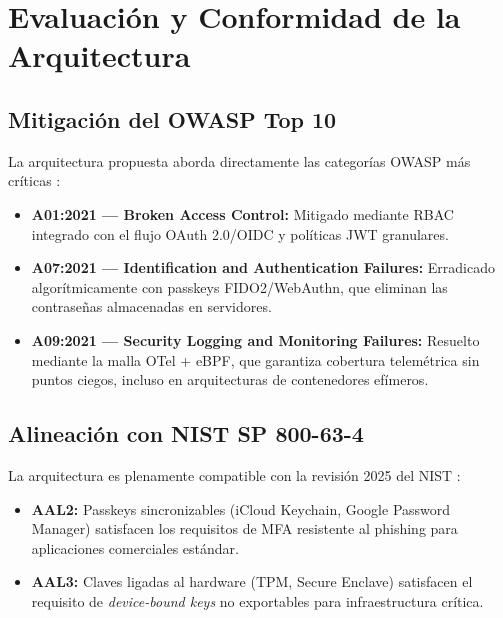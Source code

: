\documentclass[12pt, a4paper]{article}
\begin{document}
\section{Evaluación y Conformidad de la Arquitectura}

\subsection{Mitigación del OWASP Top 10}

La arquitectura propuesta aborda directamente las categorías OWASP más críticas
\cite{owasptop10,owaspSBD}:

\begin{itemize}[noitemsep]
  \item \textbf{A01:2021 --- Broken Access Control:} Mitigado mediante RBAC
        integrado con el flujo OAuth 2.0/OIDC y políticas JWT granulares.
  \item \textbf{A07:2021 --- Identification and Authentication Failures:}
        Erradicado algorítmicamente con passkeys FIDO2/WebAuthn, que eliminan
        las contraseñas almacenadas en servidores.
  \item \textbf{A09:2021 --- Security Logging and Monitoring Failures:}
        Resuelto mediante la malla OTel + eBPF, que garantiza cobertura
        telemétrica sin puntos ciegos, incluso en arquitecturas de contenedores
        efímeros.
\end{itemize}

\subsection{Alineación con NIST SP 800-63-4}

La arquitectura es plenamente compatible con la revisión 2025 del NIST
\cite{nist80063}:

\begin{itemize}[noitemsep]
  \item \textbf{AAL2:} Passkeys sincronizables (iCloud Keychain, Google
        Password Manager) satisfacen los requisitos de MFA resistente al
        phishing para aplicaciones comerciales estándar.
  \item \textbf{AAL3:} Claves ligadas al hardware (TPM, Secure Enclave)
        satisfacen el requisito de \textit{device-bound keys} no exportables
        para infraestructura crítica.
\end{itemize}
\end{document}
